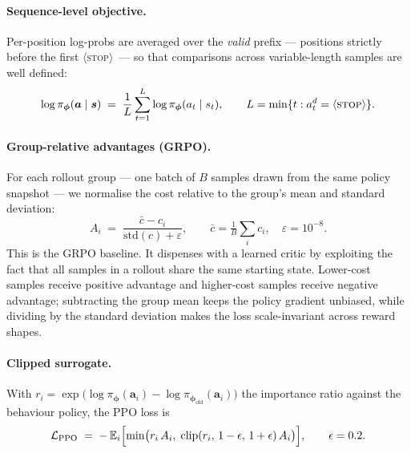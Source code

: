 \documentclass[11pt,a4paper]{article}
\newcommand{\STOP}{\ifmmode\langle\text{\textsc{stop}}\rangle\else$\langle$\textsc{stop}$\rangle$\fi}
\newcommand{\Expect}{\mathbb{E}}
\begin{document}
\paragraph{Sequence-level objective.}
Per-position log-probs are averaged over the \emph{valid} prefix --- positions strictly before the first \STOP\ --- so that comparisons across variable-length samples are well defined:
\begin{equation}
\log \pi_{\bm{\phi}}(\bm{a} \mid \bm{s})
\;=\;
\frac{1}{L}\sum_{t=1}^{L}
\log \pi_{\bm{\phi}}(a_t \mid s_t),
\qquad
L = \min\{t : a^d_t = \STOP\}.
\end{equation}

\paragraph{Group-relative advantages (GRPO).}
For each rollout group --- one batch of $B$ samples drawn from the same policy snapshot --- we normalise the cost relative to the group's mean and standard deviation:
\begin{equation}
A_i
\;=\;
\frac{\bar{c} - c_i}{\mathrm{std}(c) + \varepsilon},
\qquad
\bar{c} = \tfrac{1}{B}\sum_i c_i, \quad \varepsilon = 10^{-8}.
\label{eq:grpo-adv}
\end{equation}
This is the GRPO baseline. It dispenses with a learned critic by exploiting the fact that all samples in a rollout share the same starting state. Lower-cost samples receive positive advantage and higher-cost samples receive negative advantage; subtracting the group mean keeps the policy gradient unbiased, while dividing by the standard deviation makes the loss scale-invariant across reward shapes.

\paragraph{Clipped surrogate.}
With $r_i = \exp\bigl(\log \pi_{\bm{\phi}}(\bm{a}_i) - \log \pi_{\bm{\phi}_{\text{old}}}(\bm{a}_i)\bigr)$ the importance ratio against the behaviour policy, the PPO loss is
\begin{equation}
\mathcal{L}_{\text{PPO}}
\;=\;
-\,\Expect_i
\Bigl[
\min\bigl(
r_i\,A_i,\;
\mathrm{clip}(r_i,\, 1-\epsilon,\, 1+\epsilon)\,A_i
\bigr)
\Bigr],
\qquad \epsilon = 0.2.
\label{eq:ppo-clipped}
\end{equation}
\end{document}
